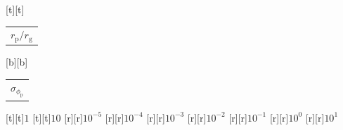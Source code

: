 %    
%
%
\begin{psfrags}%
\psfragscanon%
%
[t][t]{\color[rgb]{0,0,0}\setlength{\tabcolsep}{0pt}\begin{tabular}{c}{\Large$r_\mathrm{p}/r_\mathrm{g}$}\end{tabular}}%
[b][b]{\color[rgb]{0,0,0}\setlength{\tabcolsep}{0pt}\begin{tabular}{c}{\Large$\sigma_{\phi_\mathrm{p}}$}\end{tabular}}%
%
[t][t]{$1$}%
[t][t]{$10$}%
%
[r][r]{$10^{-5}$}%
[r][r]{$10^{-4}$}%
[r][r]{$10^{-3}$}%
[r][r]{$10^{-2}$}%
[r][r]{$10^{-1}$}%
[r][r]{$10^{0}$}%
[r][r]{$10^{1}$}%
%
%
\end{psfrags}%
%
